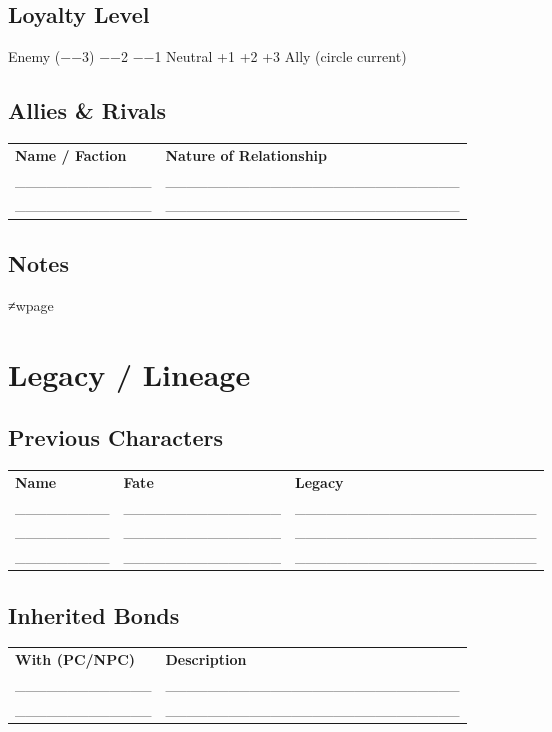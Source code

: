 \documentclass[11pt]{article}
\begin{document}
\subsection*{Loyalty Level}
Enemy (−−3) −−2 −−1 Neutral +1 +2 +3 Ally (circle current)

\subsection*{Allies & Rivals}
\small
\begin{tabularx}{\textwidth}{p{4cm} X}
\textbf{Name / Faction} & \textbf{Nature of Relationship} \\
_____________ & ____________________________ \\
_____________ & ____________________________ \\
\end{tabularx}
\normalsize

\subsection*{Notes}
\vspace{5cm}
≠wpage

\section*{Legacy / Lineage}

\subsection*{Previous Characters}
\small
\begin{tabularx}{\textwidth}{p{3cm} p{4cm} X}
\textbf{Name} & \textbf{Fate} & \textbf{Legacy} \\
_________ & _______________ & _______________________ \\
_________ & _______________ & _______________________ \\
_________ & _______________ & _______________________ \\
\end{tabularx}
\normalsize

\subsection*{Inherited Bonds}
\small
\begin{tabularx}{\textwidth}{p{4cm} X}
\textbf{With (PC/NPC)} & \textbf{Description} \\
_____________ & ____________________________ \\
_____________ & ____________________________ \\
\end{tabularx}
\normalsize
\end{document}
